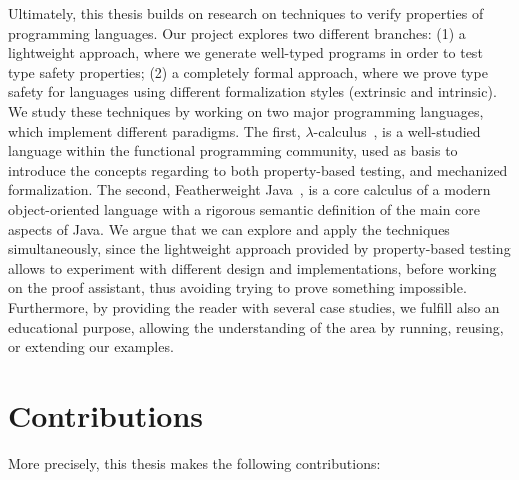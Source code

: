 \documentclass[tese,capa,english]{texufpel}
\begin{document}
Ultimately, this thesis builds on research on techniques to verify properties of programming languages. Our project explores two different branches: (1) a lightweight approach, where we generate well-typed programs in order to test type safety properties; (2) a completely formal approach, where we prove type safety for languages using different formalization styles (extrinsic and intrinsic). We study these techniques by working on two major programming languages, which implement different paradigms. The first, $\lambda$-calculus~\cite{Church32}, is a well-studied language within the functional programming community, used as basis to introduce the concepts regarding to both property-based testing, and mechanized formalization. The second, Featherweight Java~\cite{Igarashi:2001:FJM:503502.503505}, is a core calculus of a modern object-oriented language with a rigorous semantic definition of the main core aspects of Java. We argue that we can explore and apply the techniques simultaneously, since the lightweight approach provided by property-based testing allows to experiment with different design and implementations, before working on the proof assistant, thus avoiding trying to prove something impossible. Furthermore, by providing the reader with several case studies, we fulfill also an educational purpose, allowing the understanding of the area by running, reusing, or extending our examples.

\section{Contributions}

More precisely, this thesis makes the following contributions:
\end{document}
